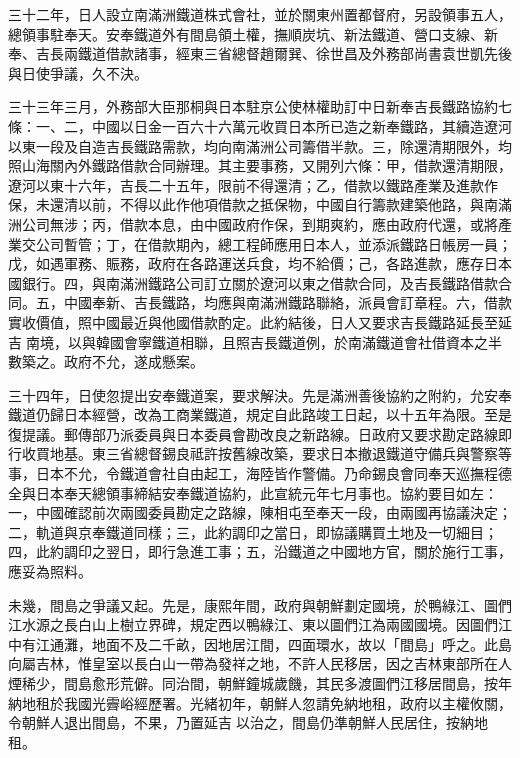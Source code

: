\begin{pinyinscope}
三十二年，日人設立南滿洲鐵道株式會社，並於關東州置都督府，另設領事五人，總領事駐奉天。安奉鐵道外有間島領土權，撫順炭坑、新法鐵道、營口支線、新奉、吉長兩鐵道借款諸事，經東三省總督趙爾巽、徐世昌及外務部尚書袁世凱先後與日使爭議，久不決。

三十三年三月，外務部大臣那桐與日本駐京公使林權助訂中日新奉吉長鐵路協約七條：一、二，中國以日金一百六十六萬元收買日本所已造之新奉鐵路，其續造遼河以東一段及自造吉長鐵路需款，均向南滿洲公司籌借半款。三，除還清期限外，均照山海關內外鐵路借款合同辦理。其主要事務，又開列六條：甲，借款還清期限，遼河以東十六年，吉長二十五年，限前不得還清；乙，借款以鐵路產業及進款作保，未還清以前，不得以此作他項借款之抵保物，中國自行籌款建築他路，與南滿洲公司無涉；丙，借款本息，由中國政府作保，到期爽約，應由政府代還，或將產業交公司暫管；丁，在借款期內，總工程師應用日本人，並添派鐵路日帳房一員；戊，如遇軍務、賑務，政府在各路運送兵食，均不給價；己，各路進款，應存日本國銀行。四，與南滿洲鐵路公司訂立關於遼河以東之借款合同，及吉長鐵路借款合同。五，中國奉新、吉長鐵路，均應與南滿洲鐵路聯絡，派員會訂章程。六，借款實收價值，照中國最近與他國借款酌定。此約結後，日人又要求吉長鐵路延長至延吉南境，以與韓國會寧鐵道相聯，且照吉長鐵道例，於南滿鐵道會社借資本之半數築之。政府不允，遂成懸案。

三十四年，日使忽提出安奉鐵道案，要求解決。先是滿洲善後協約之附約，允安奉鐵道仍歸日本經營，改為工商業鐵道，規定自此路竣工日起，以十五年為限。至是復提議。郵傳部乃派委員與日本委員會勘改良之新路線。日政府又要求勘定路線即行收買地基。東三省總督錫良祗許按舊線改築，要求日本撤退鐵道守備兵與警察等事，日本不允，令鐵道會社自由起工，海陸皆作警備。乃命錫良會同奉天巡撫程德全與日本奉天總領事締結安奉鐵道協約，此宣統元年七月事也。協約要目如左：一，中國確認前次兩國委員勘定之路線，陳相屯至奉天一段，由兩國再協議決定；二，軌道與京奉鐵道同樣；三，此約調印之當日，即協議購買土地及一切細目；四，此約調印之翌日，即行急進工事；五，沿鐵道之中國地方官，關於施行工事，應妥為照料。

未幾，間島之爭議又起。先是，康熙年間，政府與朝鮮劃定國境，於鴨綠江、圖們江水源之長白山上樹立界碑，規定西以鴨綠江、東以圖們江為兩國國境。因圖們江中有江通灘，地面不及二千畝，因地居江間，四面環水，故以「間島」呼之。此島向屬吉林，惟皇室以長白山一帶為發祥之地，不許人民移居，因之吉林東部所在人煙稀少，間島愈形荒僻。同治間，朝鮮鐘城歲饑，其民多渡圖們江移居間島，按年納地租於我國光霽峪經歷署。光緒初年，朝鮮人忽請免納地租，政府以主權攸關，令朝鮮人退出間島，不果，乃置延吉以治之，間島仍準朝鮮人民居住，按納地租。


\end{pinyinscope}

